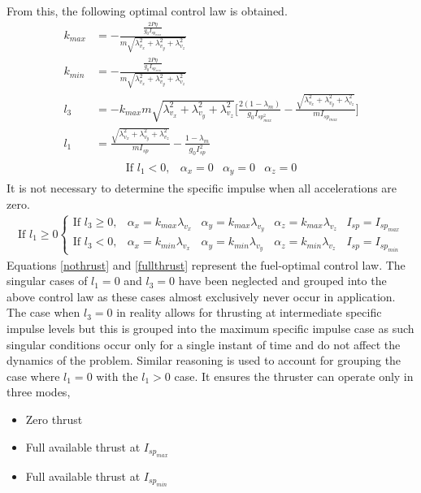 From this, the following optimal control law is obtained.
\begin{align}
	k_{max}&=-\frac{\frac{2P\eta}{g_0 I_{sp_{max}}}}{m\sqrt{\lambda_{v_x}^2+\lambda_{v_y}^2+\lambda_{v_z}^2}}\\
	k_{min}&=-\frac{\frac{2P\eta}{g_0 I_{sp_{min}}}}{m\sqrt{\lambda_{v_x}^2+\lambda_{v_y}^2+\lambda_{v_z}^2}}\\
	l_3&=-k_{max}m\sqrt{\lambda_{v_x}^2+\lambda_{v_y}^2+\lambda_{v_z}^2}\bigg[\frac{2(1-\lambda_m)}{g_0 I_{sp_{max}^2}}-\frac{\sqrt{\lambda_{v_x}^2+\lambda_{v_y}^2+\lambda_{v_z}^2}}{m I_{sp_{max}}}\bigg]\\
	l_1&=\frac{\sqrt{\lambda_{v_x}^2+\lambda_{v_y}^2+\lambda_{v_z}^2}}{mI_{sp}}-\frac{1-\lambda_m}{g_0 I_{sp}^2}
\end{align}
\begin{align}
\begin{array}{cccc}
\text{If } l_1<0, &\alpha_x=0  &\alpha_y=0 &\alpha_z=0 \label{nothrust}
\end{array}
\end{align}
It is not necessary to determine the specific impulse when all accelerations are zero.
\begin{align}
\text{If }l_1\geq 0\left \{
\begin{array}{ccccc}
\text{If } l_3\geq 0, &\alpha_x=k_{max}\lambda_{v_x}&\alpha_y=k_{max}\lambda_{v_y} &\alpha_z=k_{max}\lambda_{v_z} &I_{sp}=I_{sp_{max}}\\
\text{If } l_3< 0, &\alpha_x=k_{min}\lambda_{v_x} &\alpha_y=k_{min}\lambda_{v_y} &\alpha_z=k_{min}\lambda_{v_z} &I_{sp}=I_{sp_{min}}
\end{array}
\right.\label{fullthrust}
\end{align}
Equations \ref{nothrust} and \ref{fullthrust} represent the fuel-optimal control law. The singular cases of $l_1=0$ and $l_3=0$ have been neglected and grouped into the above control law as these cases almost exclusively never occur in application. The case when $l_3=0$ in reality allows for thrusting at intermediate specific impulse levels but this is grouped into the maximum specific impulse case as such singular conditions occur only for a single instant of time and do not affect the dynamics of the problem. Similar reasoning is used to account for grouping the case where $l_1=0$ with the $l_1>0$ case.  It ensures the thruster can operate only in three modes, 
\begin{itemize}
	\item Zero thrust
	\item Full available thrust at $I_{sp_{max}}$
	\item Full available thrust at $I_{sp_{min}}$
\end{itemize}
